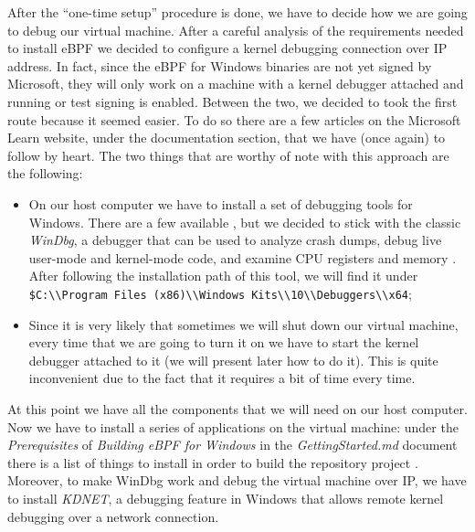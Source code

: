 After the ``one-time setup'' procedure is done, we have to decide how we are going to debug our virtual machine.
After a careful analysis of the requirements needed to install eBPF we decided to configure a kernel debugging connection over IP address.
In fact, since the eBPF for Windows binaries are not yet signed by Microsoft, they will only work on a machine with a kernel debugger attached and running or test signing is enabled.
Between the two, we decided to took the first route because it seemed easier.
To do so there are a few articles on the Microsoft Learn website, under the documentation section, that we have (once again) to follow by heart.
The two things that are worthy of note with this approach are the following:

\begin{itemize}
	\item 
		On our host computer we have to install a set of debugging tools for Windows.
		There are a few available \cite{DbgToolsWin}, but we decided to stick with the classic \textit{WinDbg}, a debugger that can be used to analyze crash dumps, debug live user-mode and kernel-mode code, and examine CPU registers and memory \cite{InstallWinDbg}.
		After following the installation path of this tool, we will find it under \colorbox{backcolour}{\lstinline[style=highlight]|$C:\\Program Files (x86)\\Windows Kits\\10\\Debuggers\\x64|};
	\item 
		Since it is very likely that sometimes we will shut down our virtual machine, every time that we are going to turn it on we have to start the kernel debugger attached to it (we will present later how to do it).
		This is quite inconvenient due to the fact that it requires a bit of time every time.  
\end{itemize}

At this point we have all the components that we will need on our host computer.
Now we have to install a series of applications on the virtual machine: under the \textit{Prerequisites} of \textit{Building eBPF for Windows} in the \textit{GettingStarted.md} document there is a list of things to install in order to build the repository project \cite{GetStartDoc}.
Moreover, to make WinDbg work and debug the virtual machine over IP, we have to install \textit{KDNET}, a debugging feature in Windows that allows remote kernel debugging over a network connection.

